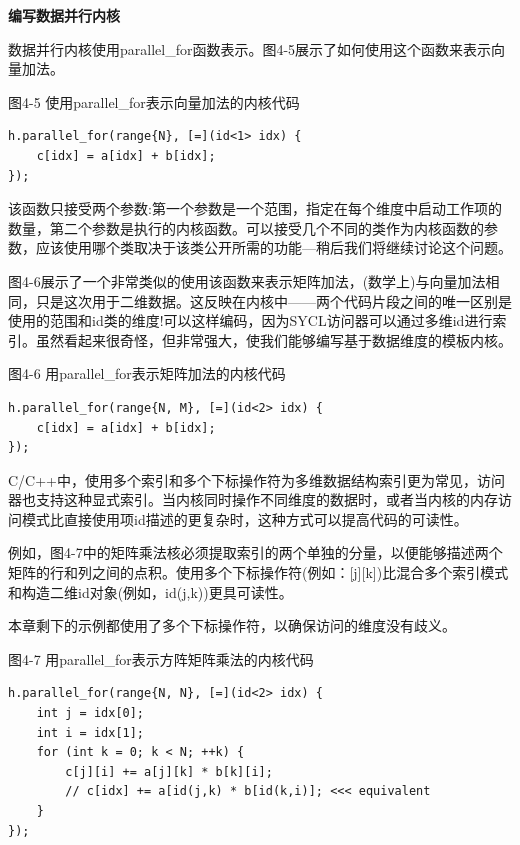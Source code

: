 \hspace*{\fill} \par %
\textbf{编写数据并行内核}

数据并行内核使用parallel\_for函数表示。图4-5展示了如何使用这个函数来表示向量加法。\par

\hspace*{\fill} \par %
图4-5 使用parallel\_for表示向量加法的内核代码
\begin{lstlisting}[caption={}]
h.parallel_for(range{N}, [=](id<1> idx) {
	c[idx] = a[idx] + b[idx];
});
\end{lstlisting}

该函数只接受两个参数:第一个参数是一个范围，指定在每个维度中启动工作项的数量，第二个参数是执行的内核函数。可以接受几个不同的类作为内核函数的参数，应该使用哪个类取决于该类公开所需的功能—稍后我们将继续讨论这个问题。\par

图4-6展示了一个非常类似的使用该函数来表示矩阵加法，(数学上)与向量加法相同，只是这次用于二维数据。这反映在内核中——两个代码片段之间的唯一区别是使用的范围和id类的维度!可以这样编码，因为SYCL访问器可以通过多维id进行索引。虽然看起来很奇怪，但非常强大，使我们能够编写基于数据维度的模板内核。\par

\hspace*{\fill} \par %
图4-6 用parallel\_for表示矩阵加法的内核代码
\begin{lstlisting}[caption={}]
h.parallel_for(range{N, M}, [=](id<2> idx) {
	c[idx] = a[idx] + b[idx];
});
\end{lstlisting}

C/C++中，使用多个索引和多个下标操作符为多维数据结构索引更为常见，访问器也支持这种显式索引。当内核同时操作不同维度的数据时，或者当内核的内存访问模式比直接使用项id描述的更复杂时，这种方式可以提高代码的可读性。\par

例如，图4-7中的矩阵乘法核必须提取索引的两个单独的分量，以便能够描述两个矩阵的行和列之间的点积。使用多个下标操作符(例如：[j][k])比混合多个索引模式和构造二维id对象(例如，id(j,k))更具可读性。\par

本章剩下的示例都使用了多个下标操作符，以确保访问的维度没有歧义。\par

\hspace*{\fill} \par %
图4-7 用parallel\_for表示方阵矩阵乘法的内核代码
\begin{lstlisting}[caption={}]
h.parallel_for(range{N, N}, [=](id<2> idx) {
	int j = idx[0];
	int i = idx[1];
	for (int k = 0; k < N; ++k) {
		c[j][i] += a[j][k] * b[k][i];
		// c[idx] += a[id(j,k) * b[id(k,i)]; <<< equivalent
	}
});
\end{lstlisting}

